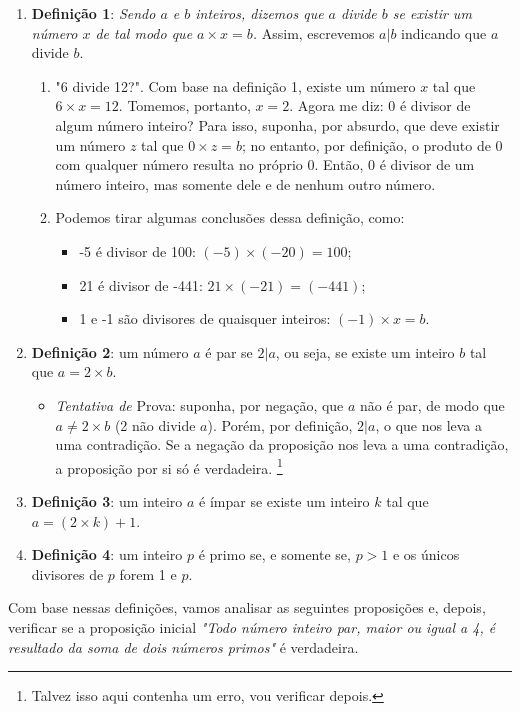 \documentclass[13pt,letterpaper]{article}
\begin{document}
\begin{enumerate}
    \item \textbf{Definição 1}: \emph{Sendo $a$ e $b$ inteiros, dizemos que $a$ divide $b$ se existir um número $x$ de tal modo que $ a \times x = b $.} Assim, escrevemos $a|b$ indicando que $a$ divide $b$.
    \begin{enumerate}
    \item "6 divide 12?". Com base na definição 1, existe um número $x$ tal que $6 \times x = 12$. Tomemos, portanto, $x = 2$. Agora me diz: 0 é divisor de algum número inteiro? Para isso, suponha, por absurdo, que deve existir um número $z$ tal que $ 0 \times z = b$; no entanto, por definição, o produto de 0 com qualquer número resulta no próprio 0. Então, 0 é divisor de um número inteiro, mas somente dele e de nenhum outro número.
    \item Podemos tirar algumas conclusões dessa definição, como:
    \begin{itemize}
        \item -5 é divisor de 100: $(-5) \times (-20) = 100$;
        \item 21 é divisor de -441: $21 \times (-21) = (-441)$;
        \item 1 e -1 são divisores de quaisquer inteiros: $(-1) \times x = b$.
    \end{itemize}
    \end{enumerate}
    
    \item \textbf{Definição 2}: um número $a$ é par se $2|a$, ou seja, se existe um inteiro $b$ tal que $a = 2 \times b$.
    \begin{itemize}
        \item \emph{Tentativa de} Prova: suponha, por negação, que $a$ não é par, de modo que $ a \ne 2 \times b$ (2 não divide $a$). Porém, por definição, $2|a$, o que nos leva a uma contradição. Se a negação da proposição nos leva a uma contradição, a proposição por si só é verdadeira.
        \footnote{Talvez isso aqui contenha um erro, vou verificar depois.}
    \end{itemize}
    \item \textbf{Definição 3}: um inteiro $a$ é ímpar se existe um inteiro $k$ tal que $a = (2 \times k) + 1$.
    \item \textbf{Definição 4}: um inteiro $p$ é primo se, e somente se, $ p > 1 $ e os únicos divisores de $p$ forem 1 e $p$.
\end{enumerate}

Com base nessas definições, vamos analisar as seguintes proposições e, depois, verificar se a proposição inicial \emph{"Todo número inteiro par, maior ou igual a 4, é resultado da soma de dois números primos"} é verdadeira.
\end{document}

